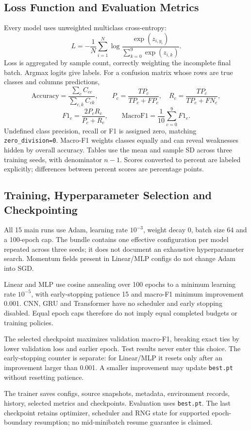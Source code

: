 \documentclass[oneside,final,a4paper]{hcmut-report}
\begin{document}
\subsection{Loss Function and Evaluation Metrics}
Every model uses unweighted multiclass cross-entropy:
\[
 L=-\frac{1}{N}\sum_{i=1}^{N}
 \log\frac{\exp(z_{i,y_i})}{\sum_{k=0}^{9}\exp(z_{i,k})}.
\]
Loss is aggregated by sample count, correctly weighting the incomplete final
batch. Argmax logits give labels. For a confusion matrix whose rows are true
classes and columns predictions,
\[
 \mathrm{Accuracy}=\frac{\sum_c C_{cc}}{\sum_{c,k}C_{ck}},\qquad
 P_c=\frac{TP_c}{TP_c+FP_c},\quad R_c=\frac{TP_c}{TP_c+FN_c},
\]
\[
 F1_c=\frac{2P_cR_c}{P_c+R_c},\qquad
 \mathrm{MacroF1}=\frac{1}{10}\sum_{c=0}^{9}F1_c.
\]
Undefined class precision, recall or F1 is assigned zero, matching
\texttt{zero\_division=0}. Macro-F1 weights classes equally and can reveal
weaknesses hidden by overall accuracy. Tables use the mean and sample SD across
three training seeds, with denominator \(n-1\). Scores converted to percent are
labeled explicitly; differences between percent scores are percentage points.

\subsection{Training, Hyperparameter Selection and Checkpointing}
\label{sec:training}
All 15 main runs use Adam, learning rate \(10^{-3}\), weight decay 0, batch size
64 and a 100-epoch cap. The bundle contains one effective configuration per model
repeated across three seeds; it does not document an exhaustive hyperparameter
search. Momentum fields present in Linear/MLP configs do not change Adam into SGD.

Linear and MLP use cosine annealing over 100 epochs to a minimum learning rate
\(10^{-5}\), with early-stopping patience 15 and macro-F1 minimum improvement
0.001. CNN, GRU and Transformer have no scheduler and early stopping disabled.
Equal epoch caps therefore do not imply equal completed budgets or training policies.

The selected checkpoint maximizes validation macro-F1, breaking exact ties by
lower validation loss and earlier epoch. Test results never enter this choice.
The early-stopping counter is separate: for Linear/MLP it resets only after an
improvement larger than 0.001. A smaller improvement may update \texttt{best.pt}
without resetting patience.

The trainer saves configs, source snapshots, metadata, environment records,
history, selected metrics and checkpoints. Evaluation uses \texttt{best.pt}.
The last checkpoint retains optimizer, scheduler and RNG state for supported
epoch-boundary resumption; no mid-minibatch resume guarantee is claimed.
\end{document}
